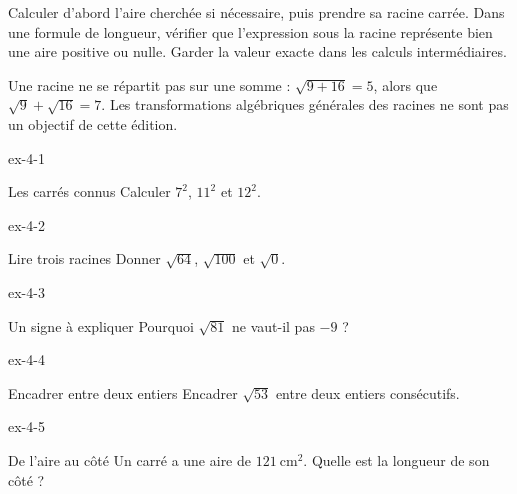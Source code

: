 \begin{savoirfaire}Calculer d’abord l’aire cherchée si nécessaire, puis prendre sa racine carrée. Dans une formule de longueur, vérifier que l’expression sous la racine représente bien une aire positive ou nulle. Garder la valeur exacte dans les calculs intermédiaires.\end{savoirfaire}
\begin{attention}Une racine ne se répartit pas sur une somme : $\sqrt{9+16}=5$, alors que $\sqrt9+\sqrt{16}=7$. Les transformations algébriques générales des racines ne sont pas un objectif de cette édition.\end{attention}

\clearpage{}
\begin{blocLivre}{ex-4-1}\begin{exercice}[1]{Les carrés connus}
Calculer $7^2$, $11^2$ et $12^2$.
\end{exercice}\end{blocLivre}
\begin{blocLivre}{ex-4-2}\begin{exercice}[1]{Lire trois racines}
Donner $\sqrt{64}$, $\sqrt{100}$ et $\sqrt{0}$.
\end{exercice}\end{blocLivre}
\begin{blocLivre}{ex-4-3}\begin{exercice}[1]{Un signe à expliquer}
Pourquoi $\sqrt{81}$ ne vaut-il pas $-9$ ?
\end{exercice}\end{blocLivre}
\begin{blocLivre}{ex-4-4}\begin{exercice}[1]{Encadrer entre deux entiers}
Encadrer $\sqrt{53}$ entre deux entiers consécutifs.
\end{exercice}\end{blocLivre}
\begin{blocLivre}{ex-4-5}\begin{exercice}[1]{De l’aire au côté}
Un carré a une aire de $121\ \mathrm{cm}^2$. Quelle est la longueur de son côté ?
\label{fig-ex-4-5}
\end{exercice}\end{blocLivre}

